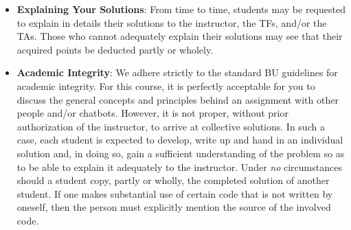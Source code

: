 \documentclass[11pt]{article}
\begin{document}
\begin{itemize}
\item{\bf Explaining Your Solutions}:
From time to time, students may be requested to explain in details
their solutions to the instructor, the TFs, and/or the TAs. Those who
cannot adequately explain their solutions may see that their acquired
points be deducted partly or wholely.

\item{\bf Academic Integrity}:
We adhere strictly to the standard BU guidelines for academic
integrity. For this course, it is perfectly acceptable for you to
discuss the general concepts and principles behind an assignment with
other people and/or chatbots. However, it is not proper, without prior
authorization of the instructor, to arrive at collective solutions. In
such a case, each student is expected to develop, write up and hand in
an individual solution and, in doing so, gain a sufficient
understanding of the problem so as to be able to explain it adequately
to the instructor.  Under {\em no} circumstances should a student
copy, partly or wholly, the completed solution of another student. If
one makes substantial use of certain code that is not written by
oneself, then the person must explicitly mention the source of the
involved code.

\end{itemize}
\end{document}
